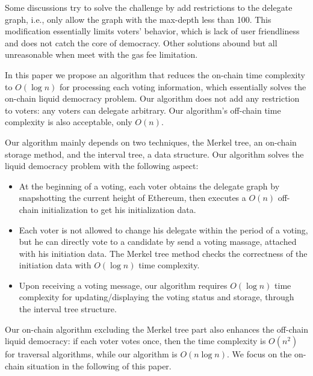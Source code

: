 Some discussions try to solve the challenge by add restrictions to the delegate graph, i.e., only allow the graph with the max-depth less than 100. This modification essentially limits voters' behavior, which is lack of user friendliness and does not catch the core of democracy. Other solutions abound but all unreasonable when meet with the gas fee limitation. 

In this paper we propose an algorithm that reduces the on-chain time complexity to $O(\log n)$ for processing each voting information, which essentially solves the on-chain liquid democracy problem. Our algorithm does not add any restriction to voters: any voters can delegate arbitrary. Our algorithm's off-chain time complexity is also acceptable, only $O(n)$. 

Our algorithm mainly depends on two techniques, the Merkel tree, an on-chain storage method, and the interval tree, a data structure. Our algorithm solves the liquid democracy  problem with the following aspect: 
\begin{itemize}
\item At the beginning of a voting, each voter obtains the delegate graph by snapshotting the current height of Ethereum, then executes a $O(n)$ off-chain initialization to get his initialization data.  
\item  Each voter is not allowed to change his delegate within the period of a voting, but he can directly vote to a candidate by send a voting massage, attached with his initiation data. The Merkel tree method checks the correctness of the initiation data with $O(\log n)$ time complexity. 
\item Upon receiving a voting message, our algorithm requires $O(\log n)$ time complexity for updating/displaying the voting status and storage, through the interval tree structure. 
\end{itemize}

Our on-chain algorithm excluding the Merkel tree part also enhances the off-chain liquid democracy: if each voter votes once, then the time complexity is $O(n^2)$ for traversal algorithms, while our algorithm is $O(n\log n)$. We focus on the on-chain situation in the following of this paper. 
